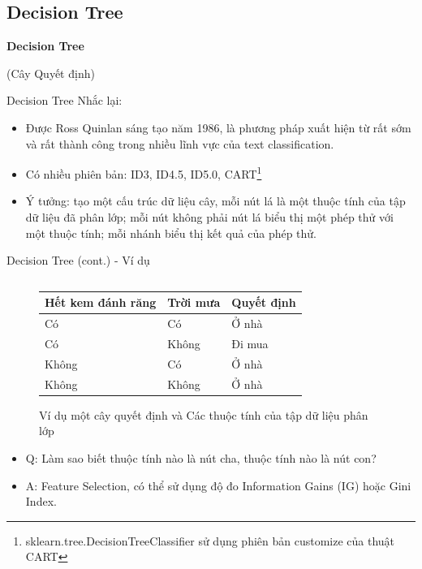 \documentclass[aspectratio=169,xcolor=dvipsnames]{beamer}
\begin{document}
\subsection{Decision Tree}

\begin{frame}
	\Huge{\centerline{\textbf{Decision Tree}}}
	{\centerline{(Cây Quyết định)}}
\end{frame}

\begin{frame}{Decision Tree}
Nhắc lại:
\begin{itemize}
\item Được Ross Quinlan sáng tạo năm 1986\cite{DBLP:journals/ml/Quinlan86}, là phương pháp xuất hiện từ rất sớm và rất thành công trong nhiều lĩnh vực của text classification.
\item Có nhiều phiên bản: ID3, ID4.5, ID5.0, CART\footnote{sklearn.tree.DecisionTreeClassifier sử dụng phiên bản customize của thuật CART\cite{scikit-learn}}
\item Ý tưởng: tạo một cấu trúc dữ liệu cây, mỗi nút lá là một thuộc tính của tập dữ liệu đã phân lớp; mỗi nút không phải nút lá biểu thị một phép thử với một thuộc tính; mỗi nhánh biểu thị kết quả của phép thử.
\end{itemize}
\end{frame}

\begin{frame}{Decision Tree (cont.) - Ví dụ}
\begin{figure}[H]
\begin{columns}[c]
\begin{table}
\begin{tabular}{|l|l|l|}
	\hline
	Hết kem đánh răng & Trời mưa & Quyết định \\
	\hline
	Có & Có & Ở nhà \\
	Có & Không & Đi mua \\
	Không & Có & Ở nhà \\
	Không & Không & Ở nhà \\
	\hline
\end{tabular}
\end{table}
\end{columns}
\caption{Ví dụ một cây quyết định và Các thuộc tính của tập dữ liệu phân lớp}
\end{figure}

\begin{itemize}
	\item Q: Làm sao biết thuộc tính nào là nút cha, thuộc tính nào là nút con?
	\item A: Feature Selection, có thể sử dụng độ đo Information Gains (IG) hoặc Gini Index.
\end{itemize}
\end{frame}
\end{document}
